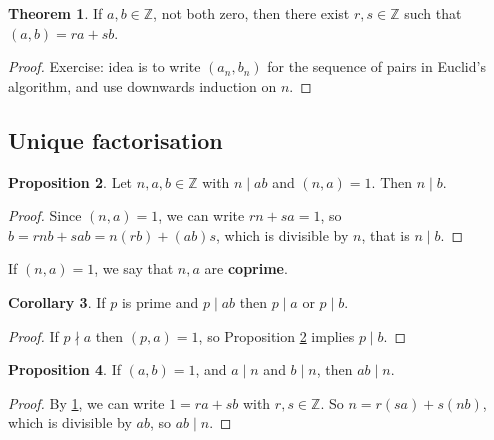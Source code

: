 \documentclass{article}
\newcommand{\Z}{\mathbb{Z}}
\newcommand{\rb}[1]{\left( #1 \right)}
\theoremstyle{definition}\newtheorem{definition}{Definition}
\theoremstyle{definition}\newtheorem{remark}[definition]{Remark}
\theoremstyle{definition}\newtheorem*{example}{Example}
\theoremstyle{definition}\newtheorem*{note}{Note}
\newtheorem{proposition}[definition]{Proposition}
\newtheorem{theorem}[definition]{Theorem}
\newtheorem{corollary}[definition]{Corollary}
\begin{document}
\begin{theorem}
\label{thm:6}
If $ a, b \in \Z $, not both zero, then there exist $ r, s \in \Z $ such that $ \rb{a, b} = ra + sb $.
\end{theorem}

\begin{proof}
Exercise: idea is to write $ \rb{a_n, b_n} $ for the sequence of pairs in Euclid's algorithm, and use downwards induction on $ n $.
\end{proof}

\subsection{Unique factorisation}

\begin{proposition}
\label{prop:7}
Let $ n, a, b \in \Z $ with $ n \mid ab $ and $ \rb{n, a} = 1 $. Then $ n \mid b $.
\end{proposition}

\begin{proof}
Since $ \rb{n, a} = 1 $, we can write $ rn + sa = 1 $, so $ b = rnb + sab = n\rb{rb} + \rb{ab}s $, which is divisible by $ n $, that is $ n \mid b $.
\end{proof}

If $ \rb{n, a} = 1 $, we say that $ n, a $ are \textbf{coprime}.


\begin{corollary}
\label{cor:8}
If $ p $ is prime and $ p \mid ab $ then $ p \mid a $ or $ p \mid b $.
\end{corollary}

\begin{proof}
If $ p \nmid a $ then $ \rb{p, a} = 1 $, so Proposition \ref{prop:7} implies $ p \mid b $.
\end{proof}

\begin{proposition}
\label{prop:9}
If $ \rb{a, b} = 1 $, and $ a \mid n $ and $ b \mid n $, then $ ab \mid n $.
\end{proposition}

\begin{proof}
By \ref{thm:6}, we can write $ 1 = ra + sb $ with $ r, s \in \Z $. So $ n = r\rb{sa} + s\rb{nb} $, which is divisible by $ ab $, so $ ab \mid n $.
\end{proof}
\end{document}
